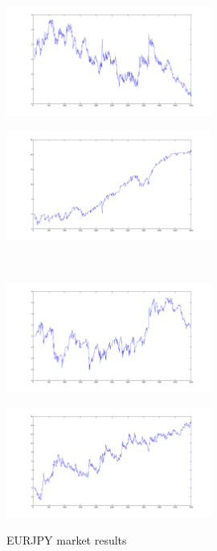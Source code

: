 \documentclass{tewiart}
\begin{document}
\begin{figure}[h]
\centering
\begin{minipage}{\linewidth}
\centering
\includegraphics[width=0.6\textwidth]{images/eurjpyA.png}
\label{jedno}
\end{minipage}
\begin{minipage}{\linewidth}
\centering
\includegraphics[width=0.6\textwidth]{images/eurjpyB.png}
\label{dwu}
\end{minipage}
\\
\begin{minipage}{\linewidth}
\centering
\includegraphics[width=0.6\textwidth]{images/eurjpyC.png}
\label{cztero}
\end{minipage}
\begin{minipage}{\linewidth}
\centering
\includegraphics[width=0.6\textwidth]{images/eurjpyD.png}
\label{mansard}
\end{minipage}
\caption{EURJPY market results}
\end{figure}
\end{document}
